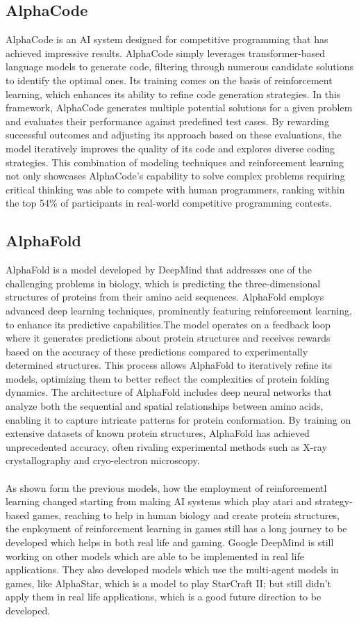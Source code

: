 \subsection*{AlphaCode}
AlphaCode is an AI system designed for competitive programming that 
has achieved impressive results. AlphaCode simply leverages 
transformer-based language models to generate code, filtering through 
numerous candidate solutions to identify 
the optimal ones. Its training comes on the basis of
reinforcement learning, which enhances its ability to refine code 
generation strategies. In this framework, AlphaCode generates 
multiple potential solutions for a given problem and evaluates their 
performance against predefined test cases. By rewarding successful 
outcomes and adjusting its approach based on these evaluations, the 
model iteratively improves the quality of its code and explores 
diverse coding strategies. This combination of modeling 
techniques and reinforcement learning not only showcases AlphaCode's 
capability to solve complex problems requiring critical thinking was
able to compete with human programmers, ranking within the top 54\% 
of participants in real-world competitive programming contests\cite{FD2}.
\subsection*{AlphaFold}
AlphaFold is a model developed by DeepMind 
that addresses one of the challenging problems in biology, which is
predicting the three-dimensional structures of proteins from their 
amino acid sequences. AlphaFold employs 
advanced deep learning techniques, prominently featuring 
reinforcement learning, to enhance its predictive capabilities.The 
model operates on a feedback loop where 
it generates predictions about protein structures and receives 
rewards based on the accuracy of these predictions compared to 
experimentally determined structures. This process allows AlphaFold 
to iteratively refine its models, optimizing them to better reflect 
the complexities of protein folding dynamics. The architecture of 
AlphaFold includes deep neural networks that analyze both the 
sequential and spatial relationships between amino acids, enabling 
it to capture intricate patterns for protein conformation. 
By training on extensive datasets of known protein structures, 
AlphaFold has achieved unprecedented accuracy, often rivaling 
experimental methods such as X-ray crystallography and cryo-electron 
microscopy\cite{FD3}.\\\\
As shown form the previous models, how the employment of reinforcementl
learning changed starting from making AI systems which play atari and strategy-based games, 
reaching to help in human biology and create protein structures, the 
enployment of reinforcement learning in games still has a long journey
to be developed which helps in both real life and gaming. Google DeepMind
is still working on other models which are able to be implemented 
in real life applications. They also developed models which use the multi-agent
models in games, like AlphaStar, which is a model to play 
StarCraft II; but still didn't apply them in real life applications, which
is a good future direction to be developed.